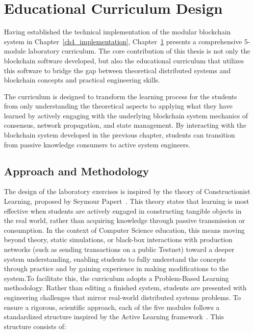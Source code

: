 \chapter{Educational Curriculum Design} \label{ch5_curriculum}


Having established the technical implementation of the modular blockchain system in Chapter~\ref{ch4_implementation}, Chapter~\ref{ch5_curriculum} presents a comprehensive 5-module laboratory curriculum. The core contribution of this thesis is not only the blockchain software developed, but also the educational curriculum that utilizes this software to bridge the gap between theoretical distributed systems and blockchain concepts and practical engineering skills.


The curriculum is designed to transform the learning process for the students from only understanding the theoretical aspects to applying what they have learned by actively engaging with the underlying blockchain system mechanics of consensus, network propagation, and state management. By interacting with the blockchain system developed in the previous chapter, students can transition from passive knowledge consumers to active system engineers.

\section{Approach and Methodology} \label{ch5_pedagogy}

The design of the laboratory exercises is inspired by the theory of Constructionist Learning, proposed by Seymour Papert~\cite{papert1991situating}. This theory states that learning is most effective when students are actively engaged in constructing tangible objects in the real world, rather than acquiring knowledge through passive transmission or consumption. In the context of Computer Science education, this means moving beyond theory, static simulations, or black-box interactions with production networks (such as sending transactions on a public Testnet) toward a deeper system understanding, enabling students to fully understand the concepts through practice and by gaining experience in making modifications to the system.\newpage To facilitate this, the curriculum adopts a Problem-Based Learning methodology. Rather than editing a finished system, students are presented with engineering challenges that mirror real-world distributed systems problems. To ensure a rigorous, scientific approach, each of the five modules follows a standardized structure inspired by the Active Learning framework~\cite{freeman2014active}. This structure consists of:


